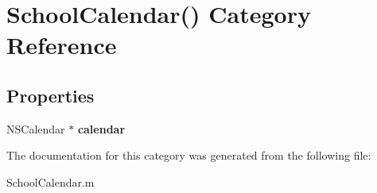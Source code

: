 \hypertarget{category_school_calendar_07_08}{\section{School\+Calendar() Category Reference}
\label{category_school_calendar_07_08}
}
\subsection*{Properties}
\begin{DoxyCompactItemize}
\item 
\hypertarget{category_school_calendar_07_08_ab61efcf32e38c7d2b2de354dddb9a06a}{N\+S\+Calendar $\ast$ {\bfseries calendar}}\label{category_school_calendar_07_08_ab61efcf32e38c7d2b2de354dddb9a06a}

\end{DoxyCompactItemize}


The documentation for this category was generated from the following file\+:\begin{DoxyCompactItemize}
\item 
School\+Calendar.\+m\end{DoxyCompactItemize}
